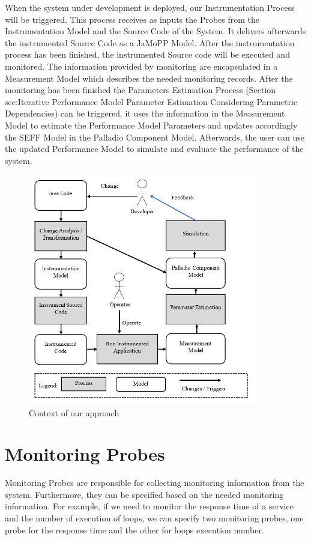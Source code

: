 When the system under development is deployed, our Instrumentation Process will be triggered. This process receives as inputs the Probes from the Instrumentation Model and the Source Code of the System. It delivers afterwards the instrumented Source Code as a JaMoPP Model. After the instrumentation process has been finished, the instrumented Source code will be executed and monitored.  The information provided by monitoring are encapsulated in a Measurement Model which describes the needed monitoring records.  After the monitoring has been finished the Parameters Estimation Process (Section sec:Iterative Performance Model Parameter Estimation Considering Parametric Dependencies) can be triggered. it uses the information in the Measurement Model to estimate the Performance Model Parameters and updates accordingly the SEFF Model in the Palladio Component Model. Afterwards, the user can use the updated Performance Model to simulate and evaluate the performance of the system. 


\begin{figure}[h]
\centering
\includegraphics[width=0.9\textwidth]{figures/approach_context}
\caption{Context of our approach}
\label{fig:Context of our approach}
\end{figure}


\section{Monitoring Probes}
\label{sec:Monitoring Probes}
Monitoring Probes are responsible for collecting monitoring information from the system. Furthermore, they can be specified based on the needed monitoring information. For example, if we need to monitor the response time of a service and the number of execution of loops, we can specify two monitoring probes, one probe for the response time and the other for loops execution number. 

